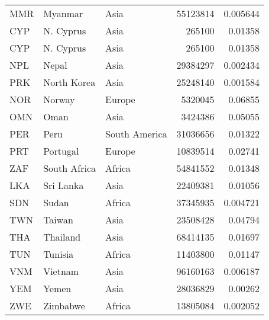 \begin{table}[h!]
\begin{tabular}{lllrr}
      MMR     & Myanmar      & Asia          & 55123814  & 0.005644      \\
      CYP     & N. Cyprus    & Asia          & 265100    & 0.01358       \\
      CYP     & N. Cyprus    & Asia          & 265100    & 0.01358       \\
      NPL     & Nepal        & Asia          & 29384297  & 0.002434      \\
      PRK     & North Korea  & Asia          & 25248140  & 0.001584      \\
      NOR     & Norway       & Europe        & 5320045   & 0.06855       \\
      OMN     & Oman         & Asia          & 3424386   & 0.05055       \\
      PER     & Peru         & South America & 31036656  & 0.01322       \\
      PRT     & Portugal     & Europe        & 10839514  & 0.02741       \\
      ZAF     & South Africa & Africa        & 54841552  & 0.01348       \\
      LKA     & Sri Lanka    & Asia          & 22409381  & 0.01056       \\
      SDN     & Sudan        & Africa        & 37345935  & 0.004721      \\
      TWN     & Taiwan       & Asia          & 23508428  & 0.04794       \\
      THA     & Thailand     & Asia          & 68414135  & 0.01697       \\
      TUN     & Tunisia      & Africa        & 11403800  & 0.01147       \\
      VNM     & Vietnam      & Asia          & 96160163  & 0.006187      \\
      YEM     & Yemen        & Asia          & 28036829  & 0.00262       \\
      ZWE     & Zimbabwe     & Africa        & 13805084  & 0.002052      \\
      \bottomrule
   \end{tabular}
\end{table}
